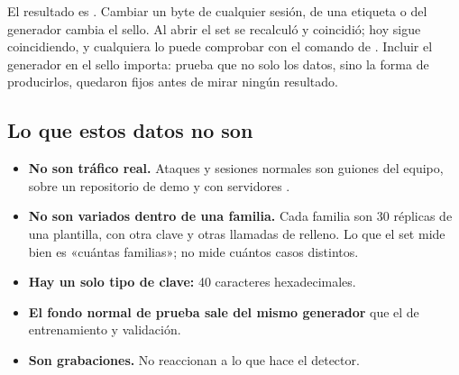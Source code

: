 El resultado es . Cambiar un byte
de cualquier sesión, de una etiqueta o del generador cambia el sello. Al abrir el set se recalculó y
coincidió; hoy sigue coincidiendo, y cualquiera lo puede comprobar con el comando de
. Incluir el generador en el sello importa: prueba que no solo los datos, sino
la forma de producirlos, quedaron fijos antes de mirar ningún resultado.

\subsection{Lo que estos datos no son}

\begin{itemize}
  \item \textbf{No son tráfico real.} Ataques y sesiones normales son guiones del equipo, sobre un
    repositorio de demo y con servidores .
  \item \textbf{No son variados dentro de una familia.} Cada familia son 30 réplicas de una plantilla,
    con otra clave y otras llamadas de relleno. Lo que el set mide bien es «cuántas familias»; no mide
    cuántos casos distintos.
  \item \textbf{Hay un solo tipo de clave:} 40 caracteres hexadecimales.
  \item \textbf{El fondo normal de prueba sale del mismo generador} que el de entrenamiento y
    validación.
  \item \textbf{Son grabaciones.} No reaccionan a lo que hace el detector.
\end{itemize}
